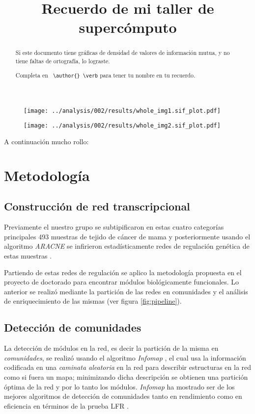 \documentclass[a4paper,12pt]{article}
\title{\textbf{Recuerdo de mi taller de supercómputo}}
\author{}
\begin{document}
\maketitle

\begin{abstract}
Si este documento tiene gráficas de densidad de valores de información mutua,
y no tiene faltas de ortografía, lo lograste.

Completa en \verb+ \author{} \verb+ para tener tu nombre en tu recuerdo.
\end{abstract}

\begin{figure}[!t]
\texttt{[image: ../analysis/002/results/whole\_img1.sif\_plot.pdf]}
\end{figure}

\begin{figure}[!t]
\texttt{[image: ../analysis/002/results/whole\_img2.sif\_plot.pdf]}
\end{figure}

A continuación mucho rollo:

\section{Metodología}

\subsection{Construcción de red transcripcional}

Previamente el nuestro grupo se subtipificaron en estas cuatro categorías principales 493 muestras de tejido de cáncer de mama \cite{AndaJauregui2015} y posteriormente usando el algoritmo \emph{ARACNE} \cite{Margolin2006} se infirieron estadísticamente redes de regulación genética de estas muestras \cite{AndaJauregui2016}.

Partiendo de estas redes de regulación se aplico la metodología propuesta en el proyecto de doctorado \cite{Alcala2016} para encontrar módulos biológicamente funcionales. Lo anterior se realizó mediante la partición de las redes en comunidades y el análisis de enriquecimiento de las mismas (ver figura \ref{fig:pipeline}).

\subsection{Detección de comunidades}

La detección de módulos en la red, es decir la partición de la misma en \emph{comunidades}, se realizó usando el algoritmo \emph{Infomap} \cite{Rosvall2008}, el cual usa la información codificada en una \emph{caminata aleatoria} en la red para describir estructuras en la red como si fuera un mapa; minimizando dicha descripción se obtienen una partición óptima de la red y por lo tanto los módulos. \emph{Infomap} ha mostrado ser de los mejores algoritmos de detección de comunidades tanto en rendimiento como en eficiencia \cite{lancichinetti2009} en términos de la prueba LFR \cite{Lancichinetti2008}.
\end{document}
